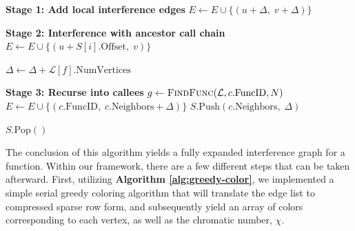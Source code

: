 \documentclass{article}
\begin{document}
\begin{algorithm}[H]
\caption{\textsc{RecursivelyPopulate}}
\label{alg:recursively-populate}
\begin{algorithmic}[1]


    \Statex \textbf{Stage 1: Add local interference edges}
            \State $E \gets E \cup \{(u+\Delta,\; v+\Delta)\}$
        \EndIf
    \EndFor

    \Statex \textbf{Stage 2: Interference with ancestor call chain}
                \State $E \gets E \cup \{(u + S[i].\text{Offset},\; v)\}$
            \EndFor
        \EndFor
    \EndFor

    \State $\Delta \gets \Delta + \mathcal{L}[f].\text{NumVertices}$

    \Statex \textbf{Stage 3: Recurse into callees}
        \State $g \gets \textsc{FindFunc}(\mathcal{L}, c.\text{FuncID}, N)$
         
            \State $E \gets E \cup \{(c.\text{FuncID},\; c.\text{Neighbors}+\Delta)\}$
        \Else
            \State $S.\text{Push}(c.\text{Neighbors},\; \Delta)$
            \State {}
        \EndIf
    \EndFor

    \State $S.\text{Pop}()$

\EndProcedure

\end{algorithmic}
\end{algorithm}

The conclusion of this algorithm yields a fully expanded interference graph for a function. Within our framework, there are a few different steps that can be taken afterward. First, utilizing \textbf{Algorithm \ref{alg:greedy-color}}, we implemented a simple serial greedy coloring algorithm that will translate the edge list to compressed sparse row form, and subsequently yield an array of colors corresponding to each vertex, as well as the chromatic number, $\chi$.
\end{document}
